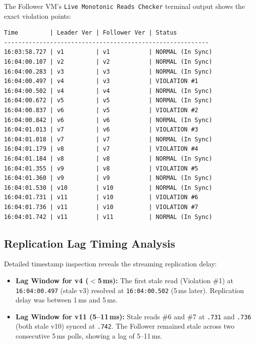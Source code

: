 \documentclass[12pt]{article}
\begin{document}
The Follower VM's \texttt{Live Monotonic Reads Checker} terminal output shows the exact violation points:

\begin{lstlisting}[caption=Follower VM Live Monotonic Reads Checker Output, basicstyle=\ttfamily\scriptsize]
Time         | Leader Ver | Follower Ver | Status
----------------------------------------------------------
16:03:58.727 | v1         | v1           | NORMAL (In Sync)
16:04:00.107 | v2         | v2           | NORMAL (In Sync)
16:04:00.283 | v3         | v3           | NORMAL (In Sync)
16:04:00.497 | v4         | v3           | VIOLATION #1
16:04:00.502 | v4         | v4           | NORMAL (In Sync)
16:04:00.672 | v5         | v5           | NORMAL (In Sync)
16:04:00.837 | v6         | v5           | VIOLATION #2
16:04:00.842 | v6         | v6           | NORMAL (In Sync)
16:04:01.013 | v7         | v6           | VIOLATION #3
16:04:01.018 | v7         | v7           | NORMAL (In Sync)
16:04:01.179 | v8         | v7           | VIOLATION #4
16:04:01.184 | v8         | v8           | NORMAL (In Sync)
16:04:01.355 | v9         | v8           | VIOLATION #5
16:04:01.360 | v9         | v9           | NORMAL (In Sync)
16:04:01.530 | v10        | v10          | NORMAL (In Sync)
16:04:01.731 | v11        | v10          | VIOLATION #6
16:04:01.736 | v11        | v10          | VIOLATION #7
16:04:01.742 | v11        | v11          | NORMAL (In Sync)
\end{lstlisting}

\subsection{Replication Lag Timing Analysis}
Detailed timestamp inspection reveals the streaming replication delay:
\begin{itemize}
    \item \textbf{Lag Window for v4 ($<$5\,ms):} The first stale read (Violation \#1) at \texttt{16:04:00.497} (stale v3) resolved at \texttt{16:04:00.502} (5\,ms later). Replication delay was between 1\,ms and 5\,ms.
    \item \textbf{Lag Window for v11 (5--11\,ms):} Stale reads \#6 and \#7 at \texttt{.731} and \texttt{.736} (both stale v10) synced at \texttt{.742}. The Follower remained stale across two consecutive 5\,ms polls, showing a lag of 5--11\,ms.
\end{itemize}

\newpage

\end{document}
